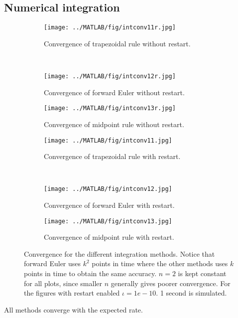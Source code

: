\subsection{Numerical integration}%
\begin{figure}[H]
        \centering
        \begin{subfigure}[b]{0.30\textwidth}
                \texttt{[image: ../MATLAB/fig/intconv11r.jpg]}
                \caption{ Convergence of trapezoidal rule without restart. }
                \label{fig:intconv11r}
        \end{subfigure}
        ~
        \begin{subfigure}[b]{0.30\textwidth}
                \texttt{[image: ../MATLAB/fig/intconv12r.jpg]}
                \caption{ Convergence of forward Euler without restart. }
                \label{fig:intconv12r}
        \end{subfigure}
        \begin{subfigure}[b]{0.30\textwidth}
                \texttt{[image: ../MATLAB/fig/intconv13r.jpg]}
                \caption{ Convergence of midpoint rule without restart. }
                \label{fig:intconv13r}
        \end{subfigure}         
        
        \begin{subfigure}[b]{0.30\textwidth}
                \texttt{[image: ../MATLAB/fig/intconv11.jpg]}
                \caption{ Convergence of trapezoidal rule with restart. }
                \label{fig:intconv11}
        \end{subfigure}
        ~
        \begin{subfigure}[b]{0.30\textwidth}
                \texttt{[image: ../MATLAB/fig/intconv12.jpg]}
                \caption{ Convergence of forward Euler with restart. }
                \label{fig:intconv12}
        \end{subfigure}
        \begin{subfigure}[b]{0.30\textwidth}
                \texttt{[image: ../MATLAB/fig/intconv13.jpg]}
                \caption{ Convergence of midpoint rule with restart. }
                \label{fig:intconv13}
        \end{subfigure}
        
 
\caption{ Convergence for the different integration methods. Notice that forward Euler uses $k^2$ points in time where the other methods uses $k$ points in time to obtain the same accuracy. $n=2$ is kept constant for all plots, since smaller $n$ generally gives poorer convergence. For the figures with restart enabled $\iota = 1e-10$. 1 second is simulated. }
\label{fig:intconv}
\end{figure}
All methods converge with the expected rate. \\

